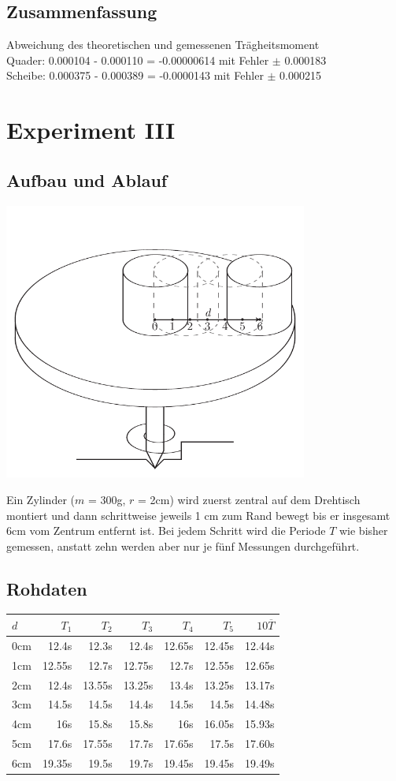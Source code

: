 \documentclass[12pt,a4paper]{article}
\begin{document}
\subsection*{Zusammenfassung}
Abweichung des theoretischen und gemessenen Tr\"agheitsmoment \\
Quader: 0.000104 - 0.000110 = -0.00000614  mit Fehler $\pm$ 0.000183 \\
Scheibe: 0.000375 - 0.000389 = -0.0000143 mit Fehler $\pm$ 0.000215

\section*{Experiment III}
\subsection*{Aufbau und Ablauf}

\begin{center}
\includegraphics[width=10cm]{illustration3.pdf}
\end{center}
Ein Zylinder ($m$ = 300g, $r$ = 2cm) wird zuerst zentral auf dem Drehtisch montiert und dann schrittweise jeweils 1 cm zum Rand bewegt bis er insgesamt 6cm vom Zentrum entfernt ist. Bei jedem Schritt wird die Periode $T$ wie bisher gemessen, anstatt zehn werden aber nur je f\"unf Messungen durchgef\"uhrt.

\subsection*{Rohdaten}
\begin{tabular}{|l|r|r|r|r|r|r|}
\hline
$d$&$T_1$&$T_2$&$T_3$&$T_4$&$T_5$&$10\overline{T}$\\
\hline
0cm&12.4s&12.3s&12.4s&12.65s&12.45s&12.44s\\
1cm&12.55s&12.7s&12.75s&12.7s&12.55s&12.65s\\
2cm&12.4s&13.55s&13.25s&13.4s&13.25s&13.17s\\
3cm&14.5s&14.5s&14.4s&14.5s&14.5s&14.48s\\
4cm&16s&15.8s&15.8s&16s&16.05s&15.93s\\
5cm&17.6s&17.55s&17.7s&17.65s&17.5s&17.60s\\
6cm&19.35s&19.5s&19.7s&19.45s&19.45s&19.49s\\
\hline
\end{tabular}
\end{document}
